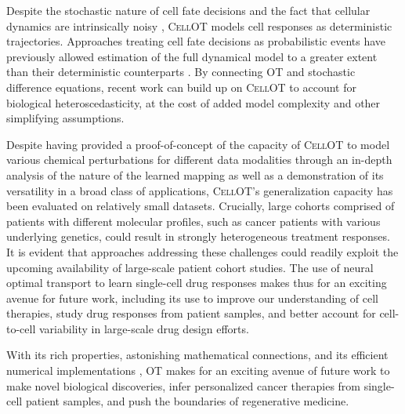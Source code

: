  Despite the stochastic nature of cell fate decisions and the fact that cellular dynamics are intrinsically noisy \citep{wilkinson2009stochastic}, \textsc{CellOT} models cell responses as deterministic trajectories. Approaches treating cell fate decisions as probabilistic events have previously allowed estimation of the full dynamical model to a greater extent than their deterministic counterparts \citep{bergen2020generalizing}.
By connecting OT and stochastic difference equations, recent work \citep{bunne2022recovering, somnath2023aligned} can build up on \textsc{CellOT} to account for biological heteroscedasticity,
at the cost of added model complexity and other simplifying assumptions.

\smallskip

Despite having provided a proof-of-concept of the capacity of \textsc{CellOT} to model various chemical perturbations for different data modalities through an in-depth analysis of the nature of the learned mapping as well as a demonstration of its versatility in a broad class of applications, \textsc{CellOT}'s generalization capacity has been evaluated on relatively small datasets. Crucially, large cohorts comprised of patients with different molecular profiles, such as cancer patients with various underlying genetics, could result in strongly heterogeneous treatment responses.
It is evident that approaches addressing these challenges could readily exploit the upcoming availability of large-scale patient cohort studies.
The use of neural optimal transport to learn single-cell drug responses makes thus for an exciting avenue for future work,
including its use to improve our understanding of cell therapies, study drug responses from patient samples, and better account for cell-to-cell variability in large-scale drug design efforts.


With its rich properties, astonishing mathematical connections, and its efficient numerical implementations \citep{cuturi2022optimal}, OT makes for an exciting avenue of future work to make novel biological discoveries, infer personalized cancer therapies from single-cell patient samples, and push the boundaries of regenerative medicine.
